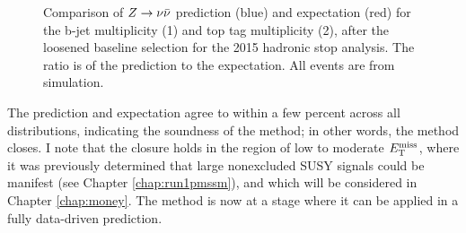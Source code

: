 \begin{figure}[tb!]
\centering
{}
\caption{Comparison of $Z\rightarrow \nu\bar{\nu}$ prediction (blue) and expectation (red) for the b-jet multiplicity (1) and top tag multiplicity (2), after the loosened baseline selection for the 2015 hadronic stop analysis. The ratio is of the prediction to the expectation. All events are from simulation.}
\label{fig:ZInvCR_NbNt}
\end{figure}
\noindent
The prediction and expectation agree to within a few percent across all distributions, indicating the soundness of the method; in other words, the method closes. I note that the closure holds in the region of low to moderate $E_{\text{T}}^{\rm miss}$, where it was previously determined that large nonexcluded SUSY signals could be manifest (see Chapter \ref{chap:run1pmssm}), and which will be considered in Chapter \ref{chap:money}. The method is now at a stage where it can be applied in a fully data-driven prediction. 

